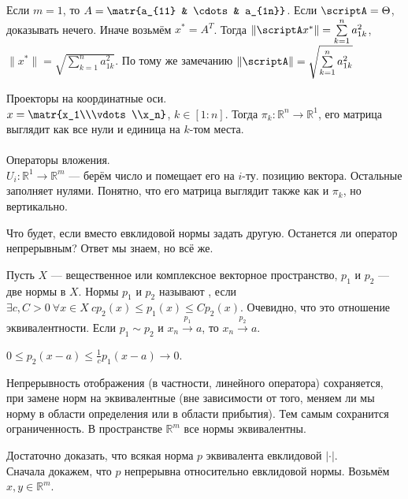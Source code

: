 \documentclass{article}
\begin{document}
\begin{itemize}
\begin{Proof}
            Если $m=1$, то $A=\matr{a_{11} & \cdots & a_{1n}}$. Если $\scriptA=\Theta$, доказывать нечего. Иначе возьмём $x^*=A^T$. Тогда $\|\scriptA x^*\|=\sum\limits_{k=1}^na_{1k}^2$, $\|x^*\|=\sqrt{\sum\limits_{k=1}^na_{1k}^2}$. По тому же замечанию $\|\scriptA\|=\sqrt{\sum\limits_{k=1}^na_{1k}^2}$
        \end{Proof}
        \begin{Example}
            Проекторы на координатные оси.\\
            $x=\matr{x_1\\\vdots\\x_n}$, $k\in[1:n]$. Тогда $\pi_k\colon\mathbb R^n\to\mathbb R^1$, его матрица выглядит как все нули и единица на $k$-том места.\\
            \\
            Операторы вложения.\\
            $U_i\colon\mathbb R^1\to\mathbb R^m$ --- берём число и помещает его на $i$-ту. позицию вектора. Остальные заполняет нулями. Понятно, что его матрица выглядит также как и $\pi_k$, но вертикально.
        \end{Example}
        \begin{Comment}
            Что будет, если вместо евклидовой нормы задать другую. Останется ли оператор непрерывным? Ответ мы знаем, но всё же.
        \end{Comment}
        \dfn Пусть $X$ --- вещественное или комплексное векторное пространство, $p_1$ и $p_2$ --- две нормы в $X$. Нормы $p_1$ и $p_2$ называют , если $\exists c,C>0~\forall x\in X~cp_2(x)\leqslant p_1(x)\leqslant Cp_2(x)$.
        \thm Очевидно, что это отношение эквивалентности.
        \thm Если $p_1\sim p_2$ и $x_n\overset{p_1}\longrightarrow a$, то $x_n\overset{p_2}\longrightarrow a$.
        \begin{Proof}
            $0\leqslant p_2(x-a)\leqslant\frac1cp_1(x-a)\longrightarrow0$.
        \end{Proof}
        \thm Непрерывность отображения (в частности, линейного оператора) сохраняется, при замене норм на эквивалентные (вне зависимости от того, меняем ли мы норму в области определения или в области прибытия). Тем самым сохранится ограниченность.
        \thm В пространстве $\mathbb R^m$ все нормы эквивалентны.
        \begin{Proof}
            Достаточно доказать, что всякая норма $p$ эквивалента евклидовой $|\cdot|$.\\
            Сначала докажем, что $p$ непрерывна относительно евклидовой нормы. Возьмём $x,y\in\mathbb R^m$.

\end{Proof}
\end{itemize}
\end{document}
